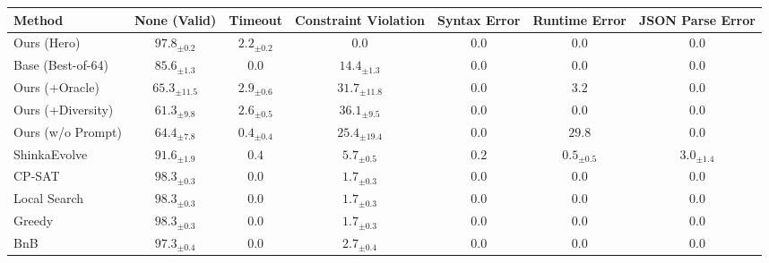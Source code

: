 \begin{tabular}{lcccccc}
\toprule
Method & None (Valid) & Timeout & Constraint Violation & Syntax Error & Runtime Error & JSON Parse Error \\
\midrule
Ours (Hero) & $97.8_{\pm 0.2}$ & $2.2_{\pm 0.2}$ & $0.0$ & $0.0$ & $0.0$ & $0.0$ \\
Base (Best-of-64) & $85.6_{\pm 1.3}$ & $0.0$ & $14.4_{\pm 1.3}$ & $0.0$ & $0.0$ & $0.0$ \\
Ours (+Oracle) & $65.3_{\pm 11.5}$ & $2.9_{\pm 0.6}$ & $31.7_{\pm 11.8}$ & $0.0$ & $3.2$ & $0.0$ \\
Ours (+Diversity) & $61.3_{\pm 9.8}$ & $2.6_{\pm 0.5}$ & $36.1_{\pm 9.5}$ & $0.0$ & $0.0$ & $0.0$ \\
Ours (w/o Prompt) & $64.4_{\pm 7.8}$ & $0.4_{\pm 0.4}$ & $25.4_{\pm 19.4}$ & $0.0$ & $29.8$ & $0.0$ \\
ShinkaEvolve & $91.6_{\pm 1.9}$ & $0.4$ & $5.7_{\pm 0.5}$ & $0.2$ & $0.5_{\pm 0.5}$ & $3.0_{\pm 1.4}$ \\
CP-SAT & $98.3_{\pm 0.3}$ & $0.0$ & $1.7_{\pm 0.3}$ & $0.0$ & $0.0$ & $0.0$ \\
Local Search & $98.3_{\pm 0.3}$ & $0.0$ & $1.7_{\pm 0.3}$ & $0.0$ & $0.0$ & $0.0$ \\
Greedy & $98.3_{\pm 0.3}$ & $0.0$ & $1.7_{\pm 0.3}$ & $0.0$ & $0.0$ & $0.0$ \\
BnB & $97.3_{\pm 0.4}$ & $0.0$ & $2.7_{\pm 0.4}$ & $0.0$ & $0.0$ & $0.0$ \\
\bottomrule
\end{tabular}
